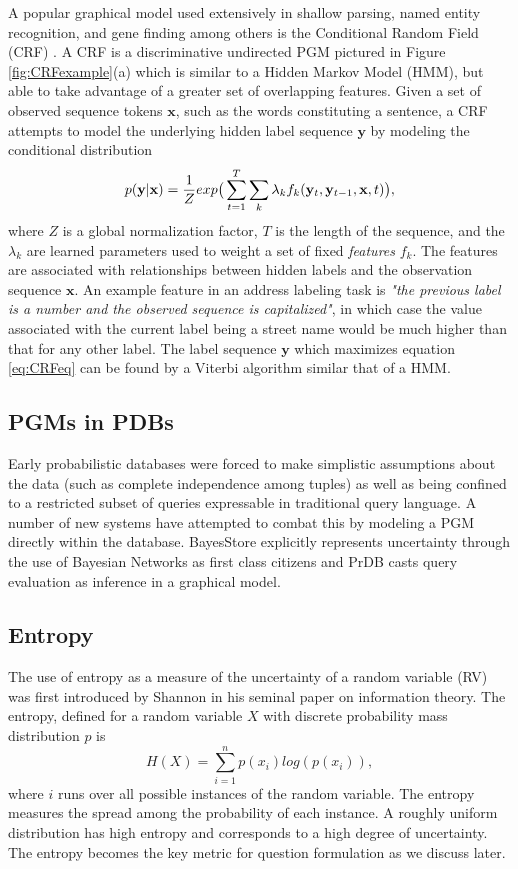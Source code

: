 A popular graphical model used extensively in shallow parsing, named entity recognition, and gene finding among others is the Conditional Random Field (CRF) \cite{Lafferty01}.  A CRF is a discriminative undirected PGM pictured in Figure \ref{fig:CRFexample}(a) which is similar to a Hidden Markov Model (HMM), but able to take advantage of a greater set of overlapping features.  Given a set of observed sequence tokens $\mathbf{x}$, such as the words constituting a sentence, a CRF attempts to model the underlying hidden label sequence $\mathbf{y}$ by modeling the conditional distribution
\begin{equation}
\label{eq:CRFeq}
p(\mathbf{y}|\mathbf{x}) = \frac{1}{Z}exp \big{(} \sum_{t=1}^{T}\sum_{k}\lambda_{k}f_{k}(\mathbf{y}_{t},\mathbf{y}_{t-1},\mathbf{x},t)\big{)},
\end{equation}
where $Z$ is a global normalization factor, $T$ is the length of the sequence, and the $\lambda_{k}$ are learned parameters used to weight a set of fixed \textit{features} $f_{k}$. The features are associated with relationships between hidden labels and the observation sequence $\mathbf{x}$.  An example feature in an address labeling task is \textit{"the previous label is a number and the observed sequence is capitalized"}, in which case the value associated with the current label being a street name would be much higher than that for any other label.  The label sequence $\mathbf{y}$ which maximizes equation \ref{eq:CRFeq} can be found by a Viterbi algorithm similar that of a HMM.

\subsection{PGMs in PDBs}
Early probabilistic databases were forced to make simplistic assumptions about the data (such as complete independence among tuples) as well as being confined to a restricted subset of queries expressable in traditional query language.  A number of new systems have attempted to combat this by modeling a PGM directly within the database.  BayesStore \cite{Wang08} explicitly represents uncertainty through the use of Bayesian Networks as first class citizens and PrDB \cite{Sen09} casts query evaluation as inference in a graphical model.

\subsection{Entropy}
The use of entropy as a measure of the uncertainty of a random variable (RV) was first introduced by Shannon \cite{Shannon48} in his seminal paper on information theory.  The entropy, defined for a random variable $X$ with discrete probability mass distribution $p$ is 
\begin{equation}
H(X) = \sum_{i=1}^{n}p(x_{i})log(p(x_{i})),
\end{equation}
where $i$ runs over all possible instances of the random variable.  The entropy measures the spread among the probability of each instance.  A roughly uniform distribution has high entropy and corresponds to a high degree of uncertainty.  The entropy becomes the key metric for question formulation as we discuss later.

